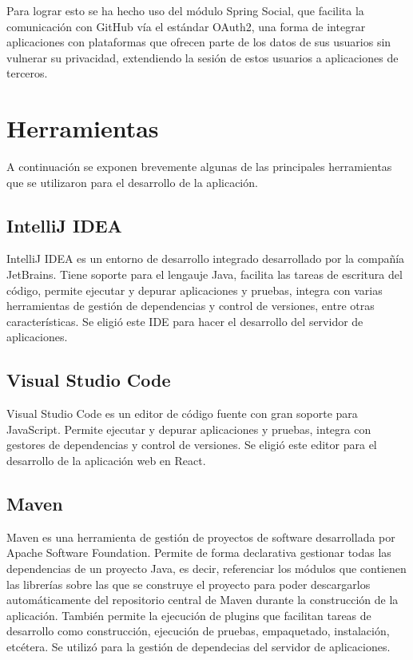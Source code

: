 \documentclass[a4paper, 12pt]{book}
\begin{document}
    Para lograr esto se ha hecho uso del módulo Spring Social, que facilita la comunicación con GitHub vía el estándar OAuth2, una forma de integrar aplicaciones con plataformas que ofrecen parte de los datos de sus usuarios sin vulnerar su privacidad, extendiendo la sesión de estos usuarios a aplicaciones de terceros.


    \section{Herramientas}
    \label{sec:intro_tools}
    A continuación se exponen brevemente algunas de las principales herramientas que se utilizaron para el desarrollo de la aplicación.

    \subsection{IntelliJ IDEA}
    \label{subsec:intro_tools_intellij}
    IntelliJ IDEA es un entorno de desarrollo integrado desarrollado por la compañía JetBrains. Tiene soporte para el lengauje Java, facilita las tareas de escritura del código, permite ejecutar y depurar aplicaciones y pruebas, integra con varias herramientas de gestión de dependencias y control de versiones, entre otras características. Se eligió este IDE para hacer el desarrollo del servidor de aplicaciones.

    \subsection{Visual Studio Code}
    \label{subsec:intro_tools_vsc}
    Visual Studio Code es un editor de código fuente con gran soporte para JavaScript. Permite ejecutar y depurar aplicaciones y pruebas, integra con gestores de dependencias y control de versiones. Se eligió este editor para el desarrollo de la aplicación web en React.

    \subsection{Maven}
    \label{subsec:intro_tools_maven}
    Maven es una herramienta de gestión de proyectos de software desarrollada por Apache Software Foundation. Permite de forma declarativa gestionar todas las dependencias de un proyecto Java, es decir, referenciar los módulos que contienen las librerías sobre las que se construye el proyecto para poder descargarlos automáticamente del repositorio central de Maven
    durante la construcción de la aplicación. También permite la ejecución de plugins que facilitan tareas de desarrollo como construcción, ejecución de pruebas, empaquetado, instalación, etcétera. Se utilizó para la gestión de dependecias del servidor de aplicaciones.
\end{document}
